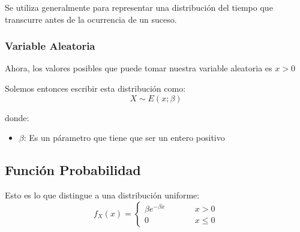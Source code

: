 \documentclass[12pt, fleqn]{report}                             %
\DeclareMathOperator \MegaSpace {\quad \quad}                   %
\theoremstyle{break}                                            %
\begin{document}
                Se utiliza generalmente para representar una distribución del tiempo
                que transcurre antes de la ocurrencia de un suceso.


                \vspace{1em}
                \subsubsection{Variable Aleatoria}

                    Ahora, los valores posibles que puede tomar nuestra variable aleatoria es
                    $x > 0$

                    Solemos entonces escribir esta distribución como:
                    \begin{equation*}
                        X \sim E(x; \beta)
                    \end{equation*}

                    donde:
                    \begin{itemize}
                        \item $\beta$: Es un párametro que tiene que ser un entero positivo
                    \end{itemize}


            \clearpage
            \subsection{Función Probabilidad}

                Esto es lo que distingue a una distribución uniforme:
                \begin{equation*}
                    f_X(x) = 
                        \begin{cases}
                            \beta e^{-\beta x}  \MegaSpace & x > 0           \\
                            0                   \MegaSpace & x \leq 0
                        \end{cases}
                \end{equation*}
                    
\end{document}
